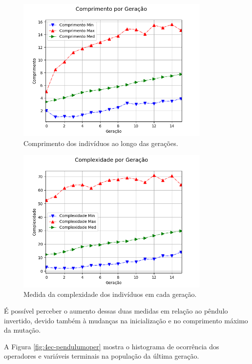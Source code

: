 \begin{figure}[H]
	\centering
	\includegraphics[width=0.85\textwidth]{02_desenvolvimento/04_EC_Fig_PendulumCompr.png}
	\caption{Comprimento dos indivíduos ao longo das gerações.}
	\label{fig:4ec-pendulumcompr}
\end{figure}

\begin{figure}[H]
	\centering
	\includegraphics[width=0.85\textwidth]{02_desenvolvimento/04_EC_Fig_PendulumCompl.png}
	\caption{Medida da complexidade dos indivíduos em cada geração.}
	\label{fig:4ec-pendulumcompl}
\end{figure}

É possível perceber o aumento dessas duas medidas em relação ao pêndulo invertido, devido também à mudanças na inicialização e no comprimento máximo da mutação. 

A Figura \ref{fig:4ec-pendulumoper} mostra o histograma de ocorrência dos operadores e variáveis terminais na população da última geração. 

